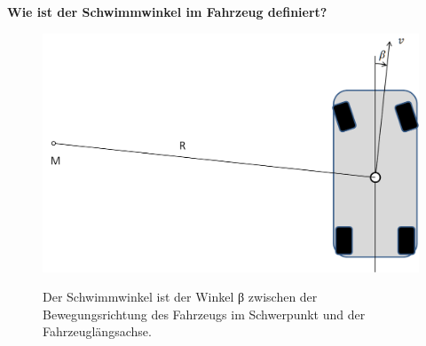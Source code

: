 \subsection{}
\subsubsection{}
\textbf{Wie ist der Schwimmwinkel im Fahrzeug definiert?}
\begin{figure}[H]
    \centering
    \begin{minipage}{.4\linewidth}
        \centering
        \includegraphics[width=\linewidth]{Graphics/Schwimmwinkel.png}
    \end{minipage}
    \begin{minipage}{.55\linewidth}
        Der Schwimmwinkel ist der Winkel β zwischen der Bewegungsrichtung des Fahrzeugs im Schwerpunkt und der Fahrzeuglängsachse.
    \end{minipage}
\end{figure}
